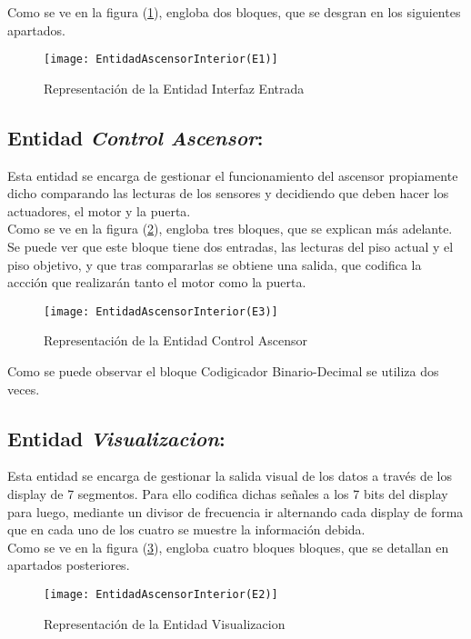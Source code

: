 	Como se ve en la figura (\ref{fig:EntidadesAscensorE1}), engloba dos bloques, que se desgran en los siguientes apartados.
	\begin{figure}[H]
		    \centering
		    \texttt{[image: EntidadAscensorInterior(E1)]}
		    \caption{Representación de la Entidad Interfaz Entrada}
		    \label{fig:EntidadesAscensorE1}
	\end{figure}

\subsection{Entidad \textit{Control Ascensor}:} \label{bloque:ControlAscensor}
	Esta entidad se encarga de gestionar el funcionamiento del ascensor propiamente dicho comparando las lecturas de los sensores y decidiendo que deben hacer los actuadores, el motor y la puerta.  \\ 

	Como se ve en la figura (\ref{fig:EntidadesAscensorE3}), engloba tres bloques, que se explican más adelante. Se puede ver que este bloque tiene dos entradas, las lecturas del piso actual y el piso objetivo, y que tras compararlas se obtiene una salida, que codifica la accción que realizarán tanto el motor como la puerta.
	\begin{figure}[H]
		    \centering
		    \texttt{[image: EntidadAscensorInterior(E3)]}
		    \caption{Representación de la Entidad Control Ascensor}
		    \label{fig:EntidadesAscensorE3}
	\end{figure}

	Como se puede observar el bloque Codigicador Binario-Decimal se utiliza dos veces. \\ 

\subsection{Entidad \textit{Visualizacion}:} \label{bloque:Visualizacion}	
	Esta entidad se encarga de gestionar la salida visual de los datos a través de los display de 7 segmentos. Para ello codifica dichas señales a los 7 bits del display para luego, mediante un divisor de frecuencia ir alternando cada display de forma que en cada uno de los cuatro se muestre la información debida.  \\ 

	Como se ve en la figura (\ref{fig:EntidadesAscensorE2}), engloba cuatro bloques bloques, que se detallan en apartados posteriores.
	\begin{figure}[H]
		    \centering
		    \texttt{[image: EntidadAscensorInterior(E2)]}
		    \caption{Representación de la Entidad Visualizacion}
		    \label{fig:EntidadesAscensorE2}
	\end{figure}

